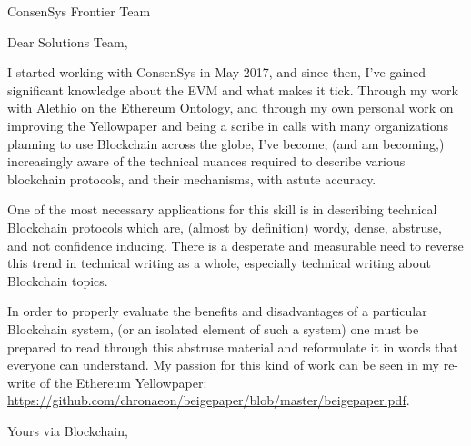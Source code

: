 \documentclass[
	pagenumber=false, %
	parskip=half, %
	fromalign=right, %
	foldmarks=true, %
	addrfield=false ]{scrlttr2}
\date{\today} %
\begin{document}
 
\begin{letter}{ConsenSys Frontier Team} %




\opening {Dear Solutions Team,}

	I started working with ConsenSys in May 2017, and since then, I've gained significant knowledge about the EVM and what makes it tick. Through my work with Alethio on the Ethereum Ontology, and through my own personal work on improving the Yellowpaper and being a scribe in calls with many organizations planning to use Blockchain across the globe, I've become, (and am becoming,) increasingly aware of the technical nuances required to describe various blockchain protocols, and their mechanisms, with astute accuracy.

	One of the most necessary applications for this skill is in describing technical Blockchain protocols which are, (almost by definition) wordy, dense, abstruse, and not confidence inducing. There is a desperate and measurable need to reverse this trend in technical writing as a whole, especially technical writing about Blockchain topics. 
	
	In order to properly evaluate the benefits and disadvantages of a particular Blockchain system, (or an isolated element of such a system) one must be prepared to read through this abstruse material and reformulate it in words that everyone can understand. My passion for this kind of work can be seen in my re-write of the Ethereum Yellowpaper: \url{https://github.com/chronaeon/beigepaper/blob/master/beigepaper.pdf}.

\closing{Yours via Blockchain,}



\end{letter}
 
\end{document}
